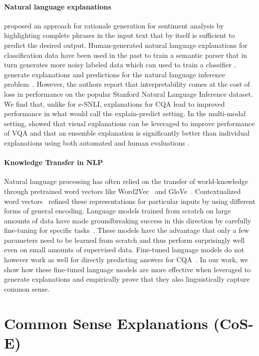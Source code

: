 \documentclass[11pt,a4paper]{article}
\begin{document}
\paragraph{Natural language explanations} \citet{lei2016rationalizing} proposed an approach for rationale generation for sentiment analysis by highlighting complete phrases in the input text that by itself is sufficient to predict the desired output. Human-generated natural language explanations for classification data have been used in the past to train a semantic parser that in turn generates more noisy labeled data which can used to train a classifier \citep{hancock2018training}. 
\citet{camburu2018snli} generate explanations and predictions for the natural language inference problem~\citep{camburu2018snli}. 
However, the authors report that interpretability comes at the cost of loss in performance on the popular Stanford Natural Language Inference \citep{bowman2015large} dataset. 
We find that, unlike for e-SNLI, explanations for CQA lead to improved performance in what \citet{camburu2018snli} would call the explain-predict setting. In the multi-modal setting, \citet{rajani2018stacking} showed that visual explanations can be leveraged to improve performance of VQA \citep{vqa} and that an ensemble explanation is significantly better than individual explanations using both automated and human evaluations \citep{rajani:vigil17}.

\paragraph{Knowledge Transfer in NLP}
Natural language processing has often relied on the transfer of world-knowledge through pretrained word vectors like Word2Vec~\citep{mikolov2013efficient} and GloVe~\citep{pennington2014glove}.
Contextualized word vectors~\citep{mccann2017learned,peters2018deep} refined these representations for particular inputs by using different forms of general encoding. 
Language models trained from scratch on large amounts of data have made groundbreaking success in this direction by carefully fine-tuning for specific tasks~\citep{dai2015semi,radford2018improving,howard2018universal,devlin2018bert}. 
These models have the advantage that only a few parameters need to be learned from scratch and thus 
perform surprisingly well even on small amounts of supervised data. 
Fine-tuned language models do not however 
work as well for directly predicting answers for CQA~\citep{talmor2018commonsenseqa}. 
In our work,
we show how these fine-tuned language models are more effective when leveraged to generate explanations and empirically prove that they also linguistically capture common sense. \section{Common Sense Explanations (CoS-E)}
\vspace{-0.2cm}
\label{sec:cose}
\end{document}
